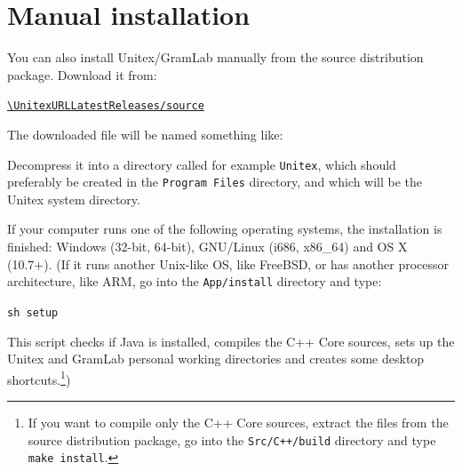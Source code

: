 \section{Manual installation}

\begin{samepage}

You can also install Unitex/GramLab manually from the source distribution package. Download it from:
\nopagebreak
\begin{center}
{\tt\url{\UnitexURLLatestReleases/source}}
\end{center}

\noindent The downloaded file will be named something like:
\begin{flushleft}
{\tt \UnitexPackageSource{}}
\end{flushleft}

\end{samepage}

\noindent Decompress it into a directory called for example {\tt Unitex\UnitexVersion{}}, which
should preferably be created in the \verb+Program Files+ directory,
and which will be the Unitex system directory.

\bigskip
\noindent If your computer runs one of the following operating systems, the installation is finished: Windows (32-bit, 64-bit), GNU/Linux (i686, x86\_64) and OS X (10.7+). (If it runs another Unix-like OS, like FreeBSD, or has another processor architecture, like ARM, go into the \verb+App/install+ directory and type:

\begin{flushleft}
\verb+sh setup+
\end{flushleft}

\noindent This script checks if Java is installed, compiles the C++ Core sources, sets up the
Unitex and GramLab personal working directories and creates some desktop shortcuts.\footnote{If
you want to compile only the C++ Core sources, extract the files from the source
distribution package, go into the {\tt Src/C++/build} directory and type {\tt make install}.})

